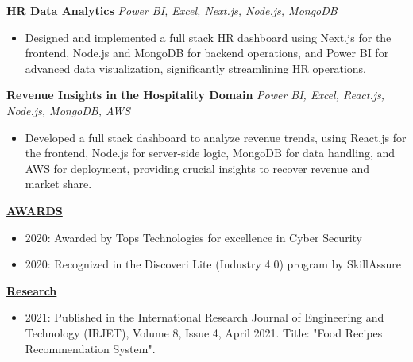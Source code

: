 \documentclass{article}
\begin{document}
\noindent \textbf{HR Data Analytics} \textit{Power BI, Excel, Next.js, Node.js, MongoDB} \hfill \textbf{}
\begin{itemize}[noitemsep,nolistsep,leftmargin=*]
\item {\small Designed and implemented a full stack HR dashboard using Next.js for the frontend, Node.js and MongoDB for backend operations, and Power BI for advanced data visualization, significantly streamlining HR operations.}
\end{itemize}

\noindent \textbf{Revenue Insights in the Hospitality Domain} \textit{Power BI, Excel, React.js, Node.js, MongoDB, AWS} \hfill \textbf{}
\begin{itemize}[noitemsep,nolistsep,leftmargin=*]
\item {\small Developed a full stack dashboard to analyze revenue trends, using React.js for the frontend, Node.js for server-side logic, MongoDB for data handling, and AWS for deployment, providing crucial insights to recover revenue and market share.}\\
\end{itemize}


\noindent \textbf{\underline{AWARDS}} 
\begin{itemize}[noitemsep,nolistsep,leftmargin=*]
\item {\small 2020: Awarded by Tops Technologies for excellence in Cyber Security}
\item {\small 2020: Recognized in the Discoveri Lite (Industry 4.0) program by SkillAssure}\\
\end{itemize}




\noindent \textbf{\underline{Research}} 
\begin{itemize}[noitemsep,nolistsep,leftmargin=*]
\item {\small 2021: Published in the International Research Journal of Engineering and Technology (IRJET), Volume 8, Issue 4, April 2021. Title: "Food Recipes Recommendation System".}
\end{itemize}
\end{document}
